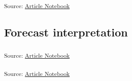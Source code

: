 \documentclass[
  letterpaper,
  DIV=11,
  numbers=noendperiod]{scrartcl}
\begin{document}
\textsubscript{Source:
\href{https://SJbrou.github.io/Supply_Chain_Data_Analysis/index.qmd.html}{Article
Notebook}}

\subsection{Forecast interpretation}\label{forecast-interpretation}

\textsubscript{Source:
\href{https://SJbrou.github.io/Supply_Chain_Data_Analysis/index.qmd.html}{Article
Notebook}}

\textsubscript{Source:
\href{https://SJbrou.github.io/Supply_Chain_Data_Analysis/index.qmd.html}{Article
Notebook}}
\end{document}
